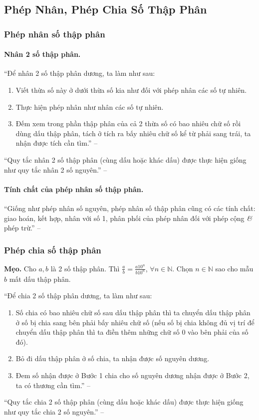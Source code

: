 \documentclass{article}
\numberwithin{equation}{section}
\begin{document}
\subsection{Phép Nhân, Phép Chia Số Thập Phân}

\subsubsection{Phép nhân số thập phân}

\paragraph{Nhân 2 số thập phân.} ``Để nhân 2 số thập phân dương, ta làm như sau:
\begin{enumerate}
	\item Viết thừa số này ở dưới thừa số kia như đối với phép nhân các số tự nhiên.
	\item Thực hiện phép nhân như nhân các số tự nhiên.
	\item Đếm xem trong phần thập phân của cả 2 thừa số có bao nhiêu chữ số rồi dùng dấu thập phân, tách ở tích ra bấy nhiêu chữ số kể từ phải sang trái, ta nhận được tích cần tìm.'' -- \cite[p. 52]{SGK_Toan_6_Canh_Dieu_tap_2}
\end{enumerate}
``Quy tắc nhân 2 số thập phân (cùng dấu hoặc khác dấu) được thực hiện giống như quy tắc nhân 2 số nguyên.'' -- \cite[p. 52]{SGK_Toan_6_Canh_Dieu_tap_2}

\paragraph{Tính chất của phép nhân số thập phân.} ``Giống như phép nhân số nguyên, phép nhân số thập phân cũng có các tính chất: giao hoán, kết hợp, nhân với số 1, phân phối của phép nhân đối với phép cộng \textit{\&} phép trừ.'' -- \cite[p. 53]{SGK_Toan_6_Canh_Dieu_tap_2}

\subsubsection{Phép chia số thập phân}
\textbf{Mẹo.} Cho $a,b$ là 2 số thập phân. Thì $\frac{a}{b} = \frac{a10^n}{b10^n}$, $\forall n\in\mathbb{N}$. Chọn $n\in\mathbb{N}$ sao cho mẫu $b$ mất dấu thập phân.

``Để chia 2 số thập phân dương, ta làm như sau:
\begin{enumerate}
	\item Số chia có bao nhiêu chữ số sau dấu thập phân thì ta chuyển dấu thập phân ở số bị chia sang bên phải bấy nhiêu chữ số (nếu số bị chia không đủ vị trí để chuyển dấu thập phân thì ta điền thêm những chữ số 0 vào bên phải của số đó).
	\item Bỏ đi dấu thập phân ở số chia, ta nhận được số nguyên dương.
	\item Đem số nhận được ở Bước 1 chia cho số nguyên dương nhận được ở Bước 2, ta có thương cần tìm.'' -- \cite[p. 54]{SGK_Toan_6_Canh_Dieu_tap_2}
\end{enumerate}
``Quy tắc chia 2 số thập phân (cùng dấu hoặc khác dấu) được thực hiện giống như quy tắc chia 2 số nguyên.'' -- \cite[p. 55]{SGK_Toan_6_Canh_Dieu_tap_2}
\end{document}
